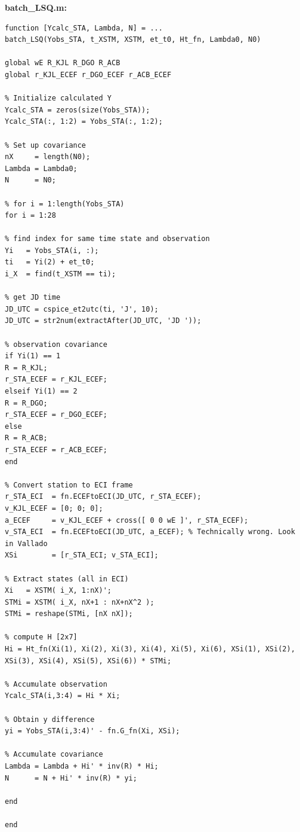 \documentclass[conf]{new-aiaa}
\begin{document}
\textbf{batch\_LSQ.m:}
\begin{lstlisting}
function [Ycalc_STA, Lambda, N] = ... 
batch_LSQ(Yobs_STA, t_XSTM, XSTM, et_t0, Ht_fn, Lambda0, N0)

global wE R_KJL R_DGO R_ACB 
global r_KJL_ECEF r_DGO_ECEF r_ACB_ECEF 

% Initialize calculated Y 
Ycalc_STA = zeros(size(Yobs_STA)); 
Ycalc_STA(:, 1:2) = Yobs_STA(:, 1:2); 

% Set up covariance 
nX     = length(N0); 
Lambda = Lambda0; 
N      = N0; 

% for i = 1:length(Yobs_STA)
for i = 1:28

% find index for same time state and observation 
Yi   = Yobs_STA(i, :); 
ti   = Yi(2) + et_t0; 
i_X  = find(t_XSTM == ti); 

% get JD time 
JD_UTC = cspice_et2utc(ti, 'J', 10); 
JD_UTC = str2num(extractAfter(JD_UTC, 'JD ')); 

% observation covariance 
if Yi(1) == 1
R = R_KJL; 
r_STA_ECEF = r_KJL_ECEF; 
elseif Yi(1) == 2
R = R_DGO; 
r_STA_ECEF = r_DGO_ECEF; 
else 
R = R_ACB; 
r_STA_ECEF = r_ACB_ECEF; 
end 

% Convert station to ECI frame 
r_STA_ECI  = fn.ECEFtoECI(JD_UTC, r_STA_ECEF); 
v_KJL_ECEF = [0; 0; 0]; 
a_ECEF     = v_KJL_ECEF + cross([ 0 0 wE ]', r_STA_ECEF); 
v_STA_ECI  = fn.ECEFtoECI(JD_UTC, a_ECEF); % Technically wrong. Look in Vallado 
XSi        = [r_STA_ECI; v_STA_ECI]; 

% Extract states (all in ECI) 
Xi   = XSTM( i_X, 1:nX)'; 
STMi = XSTM( i_X, nX+1 : nX+nX^2 ); 
STMi = reshape(STMi, [nX nX]); 

% compute H [2x7]
Hi = Ht_fn(Xi(1), Xi(2), Xi(3), Xi(4), Xi(5), Xi(6), XSi(1), XSi(2), XSi(3), XSi(4), XSi(5), XSi(6)) * STMi; 

% Accumulate observation 
Ycalc_STA(i,3:4) = Hi * Xi; 

% Obtain y difference 
yi = Yobs_STA(i,3:4)' - fn.G_fn(Xi, XSi); 

% Accumulate covariance 
Lambda = Lambda + Hi' * inv(R) * Hi; 
N      = N + Hi' * inv(R) * yi; 

end 

end 
\end{lstlisting}
\end{document}
